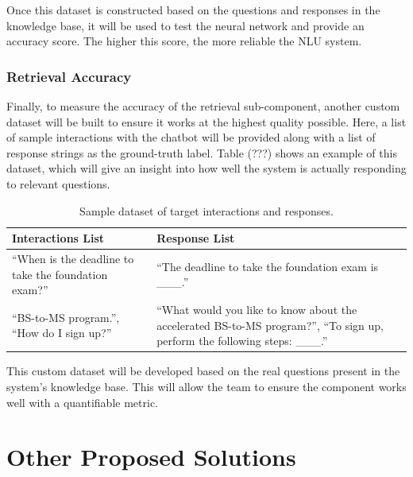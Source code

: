 \documentclass[titlepage, 12pt]{article}
\begin{document}
Once this dataset is constructed based on the questions and responses in the knowledge base, it will be used to test the neural network and provide an accuracy score. The higher this score, the more reliable the NLU system.

\subsubsection{Retrieval Accuracy}

Finally, to measure the accuracy of the retrieval sub-component, another custom dataset will be built to ensure it works at the highest quality possible. Here, a list of sample interactions with the chatbot will be provided along with a list of response strings as the ground-truth label. Table (???) shows an example of this dataset, which will give an insight into how well the system is actually responding to relevant questions.

\begin{center}
\begin{table}[h]
    \centering
    \begin{tabular}{ L{6cm} L{6cm} }
        \toprule
        \textbf{Interactions List} & \textbf{Response List}
        \tabularnewline
        \midrule
        “When is the deadline to take the foundation exam?” & “The deadline to take the foundation exam is \_\_\_.”
        \tabularnewline
        \midrule 
        “BS-to-MS program.”, “How do I sign up?” & “What would you like to know about the accelerated BS-to-MS program?”, “To sign up, perform the following steps: \_\_\_.”
        \tabularnewline
        \bottomrule
    \end{tabular}
    \caption{Sample dataset of target interactions and responses.}
\end{table}
\end{center}

This custom dataset will be developed based on the real questions present in the system’s knowledge base. This will allow the team to ensure the component works well with a quantifiable metric.

\pagebreak








\section{Other Proposed Solutions}
\end{document}
